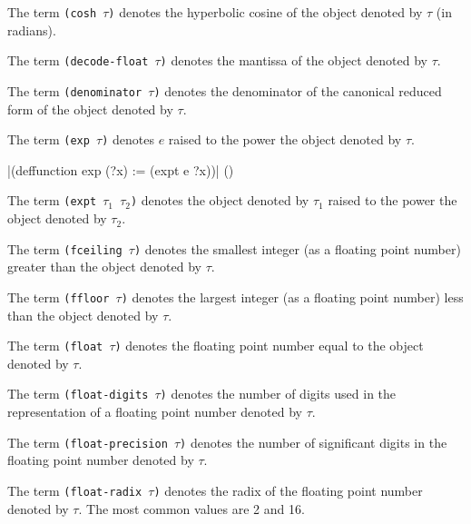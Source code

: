{The term {\tt (cosh $\tau$)} denotes the hyperbolic cosine of the object denoted by $\tau$ (in radians).}



{The term {\tt (decode-float $\tau$)} denotes the mantissa of the object denoted by $\tau$.}



{The term {\tt (denominator $\tau$)} denotes the denominator of the canonical reduced form of
the object denoted by $\tau$.}



{The term {\tt (exp $\tau$)} denotes $e$ raised to the power the
object denoted by $\tau$.}

\medskip
\verbatim|(deffunction exp (?x) :=  (expt e ?x))|
\hfill(\equation)\par 
\medskip

{The term {\tt (expt $\tau_1$ $\tau_2$)} denotes the object denoted by
$\tau_1$ raised to the power the object denoted by $\tau_2$.}



{The term {\tt (fceiling $\tau$)} denotes the smallest integer (as a floating point number) greater than
the object denoted by $\tau$.}



{The term {\tt (ffloor $\tau$)} denotes the largest integer (as a floating point number) less than
the object denoted by $\tau$.}



{The term {\tt (float $\tau$)} denotes the floating point number equal to the object denoted by
$\tau$.}



{The term {\tt (float-digits $\tau$)} denotes the number of digits used in the representation
of a floating point number denoted by $\tau$.}



{The term {\tt (float-precision $\tau$)} denotes the number of significant digits
in the floating point number denoted by $\tau$.}



{The term {\tt (float-radix $\tau$)} denotes the radix of the 
floating point number denoted by $\tau$. The most common values are 2
and 16.}



